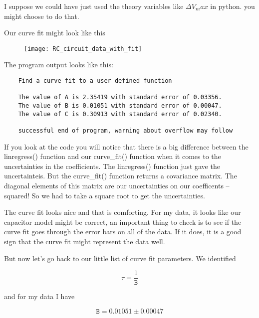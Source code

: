 I suppose we could have just used the theory variables like $\Delta V_max$ in python. you might choose to do that.

\vspace{1in}

Our curve fit might look like this

\begin{figure}[h!]
	\centering
	\texttt{[image: RC\_circuit\_data\_with\_fit]}
\end{figure}

\noindent The program output looks like this:

\begin{verbatim}
	Find a curve fit to a user defined function
	
	The value of A is 2.35419 with standard error of 0.03356.
	The value of B is 0.01051 with standard error of 0.00047.
	The value of C is 0.30913 with standard error of 0.02340.
	
	successful end of program, warning about overflow may follow
\end{verbatim}

If you look at the code you will notice that there is a big difference between the linregress() function and our curve\_fit() function when it comes to the uncertainties in the coefficients. The linregress() function just gave the uncertainteis. But the curve\_fit() function returns a covariance matrix. The diagonal elements of this matrix are our uncertainties on our coefficents -- squared! So we had to take a square root to get the uncertainties.

The curve fit looks nice and that is comforting. For my data, it looks like our capacitor model might be correct, an important thing to check is to see if the curve fit goes through the error bars on all of the data. If it does, it is a good sign that the curve fit might represent the data well.

But now let's go back to our little list of curve fit parameters. We identified 

\begin{equation*}
	\tau =\frac{1}{\mathtt{B}}
\end{equation*}

\noindent and for my data I have 

\begin{equation*}
	\mathtt{B}=0.01051\pm 0.00047
\end{equation*}
\newline

